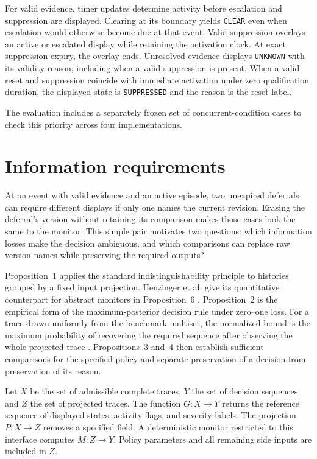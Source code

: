 \documentclass[preprint,11pt]{elsarticle}
\newcommand{\code}[1]{\texttt{#1}}
\begin{document}
For valid evidence, timer updates determine activity before escalation and suppression are displayed. Clearing at its boundary yields \code{CLEAR} even when escalation would otherwise become due at that event. Valid suppression overlays an active or escalated display while retaining the activation clock. At exact suppression expiry, the overlay ends. Unresolved evidence displays \code{UNKNOWN} with its validity reason, including when a valid suppression is present. When a valid reset and suppression coincide with immediate activation under zero qualification duration, the displayed state is \code{SUPPRESSED} and the reason is the reset label.

The evaluation includes a separately frozen set of concurrent-condition cases to check this priority across four implementations.

\section{Information requirements}
At an event with valid evidence and an active episode, two unexpired deferrals can require different displays if only one names the current revision. Erasing the deferral's version without retaining its comparison makes those cases look the same to the monitor. This simple pair motivates two questions: which information losses make the decision ambiguous, and which comparisons can replace raw version names while preserving the required outputs?

Proposition~1 applies the standard indistinguishability principle to histories grouped by a fixed input projection. Henzinger et al. give its quantitative counterpart for abstract monitors in Proposition~6 \cite{henzinger2022abstract}. Proposition~2 is the empirical form of the maximum-posterior decision rule under zero--one loss. For a trace drawn uniformly from the benchmark multiset, the normalized bound is the maximum probability of recovering the required sequence after observing the whole projected trace \cite[Definition~3]{smith2009foundations}. Propositions~3 and~4 then establish sufficient comparisons for the specified policy and separate preservation of a decision from preservation of its reason.

Let $X$ be the set of admissible complete traces, $Y$ the set of decision sequences, and $Z$ the set of projected traces. The function $G:X\rightarrow Y$ returns the reference sequence of displayed states, activity flags, and severity labels. The projection $P:X\rightarrow Z$ removes a specified field. A deterministic monitor restricted to this interface computes $M:Z\rightarrow Y$. Policy parameters and all remaining side inputs are included in $Z$.
\end{document}
